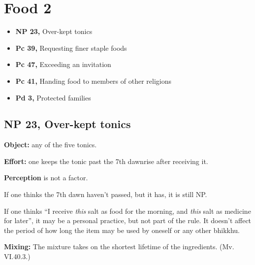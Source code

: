 \chapter{Food 2}

\begin{itemize}
\tightlist
\item
  \textbf{NP 23,} Over-kept tonics
\item
  \textbf{Pc 39,} Requesting finer staple foods
\item
  \textbf{Pc 47,} Exceeding an invitation
\item
  \textbf{Pc 41,} Handing food to members of other religions
\item
  \textbf{Pd 3,} Protected families
\end{itemize}

\section{NP 23, Over-kept tonics}


\begin{multicols}{2}

\textbf{Object:} any of the five tonics.

\textbf{Effort:} one keeps the tonic past the 7th dawnrise after
receiving it.

\textbf{Perception} is not a factor.

If one thinks the 7th dawn haven't passed, but it has, it is still NP.

If one thinks ``I receive \emph{this} salt as food for the morning, and
\emph{this} salt as medicine for later'', it may be a personal practice,
but not part of the rule. It doesn't affect the period of how long the
item may be used by oneself or any other bhikkhu.

\end{multicols}
\par
\enlargethispage{2\baselineskip}

\textbf{Mixing:} The mixture takes on the shortest lifetime of the
ingredients. (Mv. VI.40.3.)

